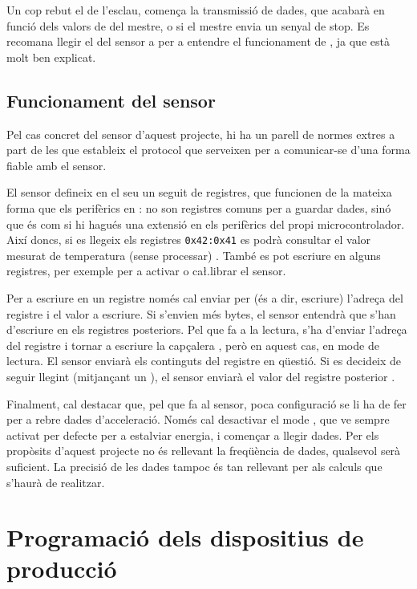 Un cop rebut el  de l'esclau, comença la transmissió de
dades, que acabarà en funció dels valors de  del mestre, o
si el mestre envia un senyal de stop. Es recomana llegir el  del
sensor a \cite{mpu6050specs} per a entendre el funcionament de ,
ja que està molt ben explicat.

\subsection{Funcionament del sensor }

Pel cas concret del sensor d'aquest projecte, hi ha un parell de normes extres
a part de les que estableix el protocol  que serveixen per a comunicar-se
d'una forma fiable amb el sensor.

El sensor  defineix en el seu  un seguit de
registres, que funcionen de la mateixa forma que els perifèrics en :
no son registres comuns per a guardar dades, sinó que és com si hi hagués una
extensió en els perifèrics del propi microcontrolador. Així doncs, si es llegeix
els registres \texttt{0x42:0x41} es podrà consultar el valor mesurat de temperatura
(sense processar) \cite{MPU6050reg}. També es pot escriure en alguns registres,
per exemple per a activar o ca\l.librar el sensor.

Per a escriure en un registre només cal enviar per  (és a dir, escriure)
l'adreça del registre i el valor a escriure. Si s'envien més bytes, el sensor
entendrà que s'han d'escriure en els registres posteriors. Pel que fa a la lectura,
s'ha d'enviar l'adreça del registre i tornar a escriure la capçalera ,
però en aquest cas, en mode de lectura. El sensor enviarà els continguts del
registre en qüestió. Si es decideix de seguir llegint (mitjançant un ),
el sensor enviarà el valor del registre posterior \cite{mpu6050specs}.

Finalment, cal destacar que, pel que fa al sensor, poca configuració se li ha de
fer per a rebre dades d'acceleració. Només cal desactivar el mode ,
que ve sempre activat per defecte per a estalviar energia, i començar a llegir
dades. Per els propòsits d'aquest projecte no és rellevant la freqüència de
dades, qualsevol serà suficient. La precisió de les dades tampoc és tan rellevant
per als calculs que s'haurà de realitzar.

\section{Programació dels dispositius de producció}

